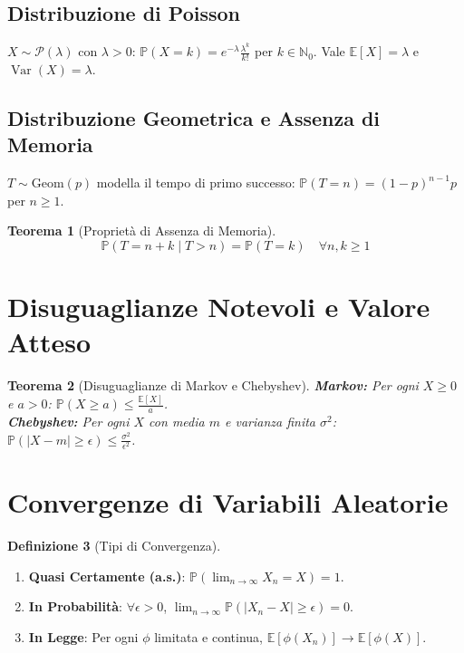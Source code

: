 \documentclass[11pt, a4paper]{report}
\theoremstyle{plain}
\newtheorem{theorem}{Teorema}[chapter]
\theoremstyle{definition}
\newtheorem{definition}[theorem]{Definizione}
\theoremstyle{remark}
\newcommand{\PP}{\mathbb{P}}
\newcommand{\E}{\mathbb{E}}
\newcommand{\N}{\mathbb{N}}
\newcommand{\1}{\mathbf{1}}
\newcommand{\Var}{\operatorname{Var}}
\begin{document}
\subsection{Distribuzione di Poisson}
$X \sim \mathcal{P}(\lambda)$ con $\lambda > 0$: $\PP(X = k) = e^{-\lambda} \frac{\lambda^k}{k!}$ per $k \in \N_0$. Vale $\E[X] = \lambda$ e $\Var(X) = \lambda$.

\subsection{Distribuzione Geometrica e Assenza di Memoria}
$T \sim \text{Geom}(p)$ modella il tempo di primo successo: $\PP(T = n) = (1-p)^{n-1} p$ per $n \ge 1$.
\begin{theorem}[Proprietà di Assenza di Memoria]
\[ \PP(T = n + k \mid T > n) = \PP(T = k) \quad \forall n, k \ge 1 \]
\end{theorem}

\section{Disuguaglianze Notevoli e Valore Atteso}

\begin{theorem}[Disuguaglianze di Markov e Chebyshev]
\textbf{Markov:} Per ogni $X \ge 0$ e $a > 0$: $\PP(X \ge a) \le \frac{\E[X]}{a}$.\\
\textbf{Chebyshev:} Per ogni $X$ con media $m$ e varianza finita $\sigma^2$: $\PP(|X - m| \ge \epsilon) \le \frac{\sigma^2}{\epsilon^2}$.
\end{theorem}

\section{Convergenze di Variabili Aleatorie}

\begin{definition}[Tipi di Convergenza]
\begin{enumerate}
    \item \textbf{Quasi Certamente (a.s.)}: $\PP(\lim_{n\to\infty} X_n = X) = 1$.
    \item \textbf{In Probabilità}: $\forall \epsilon > 0$, $\lim_{n\to\infty} \PP(|X_n - X| \ge \epsilon) = 0$.
    \item \textbf{In Legge}: Per ogni $\phi$ limitata e continua, $\E[\phi(X_n)] \to \E[\phi(X)]$.
\end{enumerate}
\end{definition}
\end{document}
